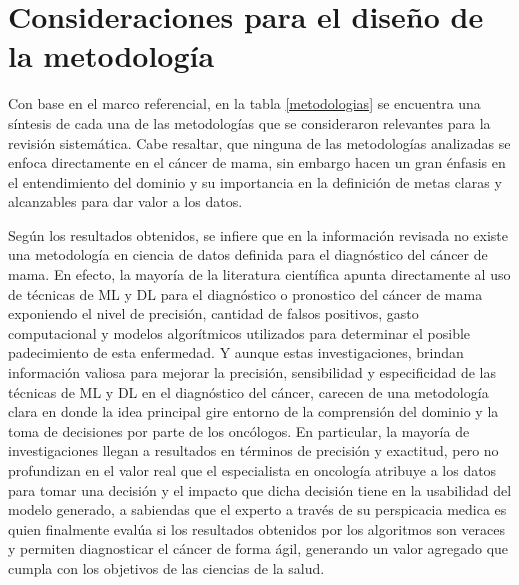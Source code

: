 \chapter{Consideraciones para el diseño de la metodología}
Con base en el marco referencial, en la tabla \ref{metodologias} se encuentra una síntesis de cada una de las  metodologías que se consideraron relevantes para la revisión sistemática. Cabe resaltar, que ninguna de las metodologías analizadas se enfoca directamente en el cáncer de mama, sin embargo hacen un gran énfasis en el entendimiento del dominio y su importancia en la definición de metas claras y alcanzables para dar valor a los datos. 

Según los resultados obtenidos, se infiere que en la información revisada no existe una metodología en ciencia de datos definida para el diagnóstico del cáncer de mama.  En efecto, la mayoría de la literatura científica apunta directamente al uso de técnicas de ML y DL para el diagnóstico o pronostico del cáncer de mama exponiendo el nivel de precisión, cantidad de falsos positivos, gasto computacional y modelos algorítmicos utilizados para determinar el posible padecimiento de esta enfermedad. Y aunque estas investigaciones, brindan información valiosa para mejorar la precisión, sensibilidad y especificidad de las técnicas de ML y DL en el diagnóstico del cáncer, carecen de una metodología clara en donde la idea principal gire entorno de la comprensión del dominio y la toma de decisiones por parte de los oncólogos. En particular, la mayoría de investigaciones llegan a resultados en términos de precisión y exactitud, pero no profundizan en el valor real que el especialista en oncología atribuye a los datos para tomar una decisión y el impacto que dicha decisión tiene en la usabilidad del modelo generado, a sabiendas que el experto a través de su perspicacia medica es quien finalmente evalúa si los resultados obtenidos por los algoritmos son veraces y permiten diagnosticar el cáncer de forma ágil, generando un valor agregado que cumpla con los objetivos de las ciencias de la salud. 

